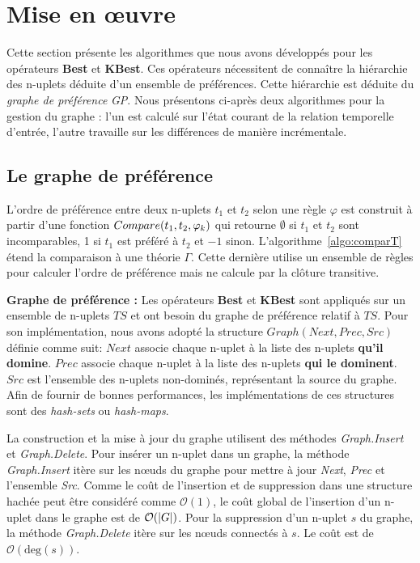 \section{Mise en œuvre}\label{sec:ext:prefs:algo}
Cette section présente les algorithmes que nous avons développés pour les opérateurs \textbf{Best} et \textbf{KBest}. Ces opérateurs nécessitent de connaître la hiérarchie des n-uplets déduite d'un ensemble de préférences. Cette hiérarchie est déduite du \textit{graphe de préférence} \textit{GP}. Nous présentons ci-après deux algorithmes pour la gestion du graphe : l'un est calculé sur l'état courant de la relation temporelle d'entrée, l'autre travaille sur les différences de manière incrémentale.

\subsection{Le graphe de préférence}
L'ordre de préférence entre deux n-uplets $t_1$ et $t_2$ selon une règle $\varphi$ est construit à partir d'une fonction $Com\-pare(t_1,t_2,\varphi_k)$ qui retourne $\emptyset$ si $t_1$ et $t_2$ sont incomparables, 1 si $t_1$ est préféré à $t_2$ et $-1$ sinon. L'algorithme~\ref{algo:comparT} étend la comparaison à une théorie $\Gamma$. Cette dernière utilise un ensemble de règles pour calculer l'ordre de préférence mais ne calcule par la clôture transitive.

\textbf{Graphe de préférence : }
Les opérateurs \textbf{Best} et \textbf{KBest} sont appliqués sur un ensemble de n-uplets $TS$ et ont besoin du graphe de préférence relatif à $TS$.
Pour son implémentation, nous avons adopté la structure $Graph(Next, Prec, Src)$ définie comme suit:
 $Next$ associe chaque n-uplet à la liste des n-uplets \textbf{qu'il domine}.
 $Prec$ associe chaque n-uplet à la liste des n-uplets \textbf{qui le dominent}.
 $Src$ est l'ensemble des n-uplets non-dominés, représentant la source du graphe.
Afin de fournir de bonnes performances, les implémentations de ces structures sont des \textit{hash-sets} ou \textit{hash-maps}.

La construction et la mise à jour du graphe utilisent des méthodes \textit{Graph.Insert} et \textit{Graph.Delete}. Pour insérer un n-uplet dans un graphe, la méthode \textit{Graph.Insert} itère sur les nœuds du graphe pour mettre à jour \textit{Next}, \textit{Prec} et l'ensemble \textit{Src}. Comme le coût de l'insertion et de suppression dans une structure hachée peut être considéré comme $\mathcal O(1)$, le coût global de l'insertion d'un n-uplet dans le graphe est de $\mathcal O(\left| G \right|)$. Pour la suppression d'un n-uplet $s$ du graphe, la méthode \textit{Graph.Delete} itère sur les nœuds connectés à $s$. Le coût est de $\mathcal O(\mathrm{deg}(s))$.

